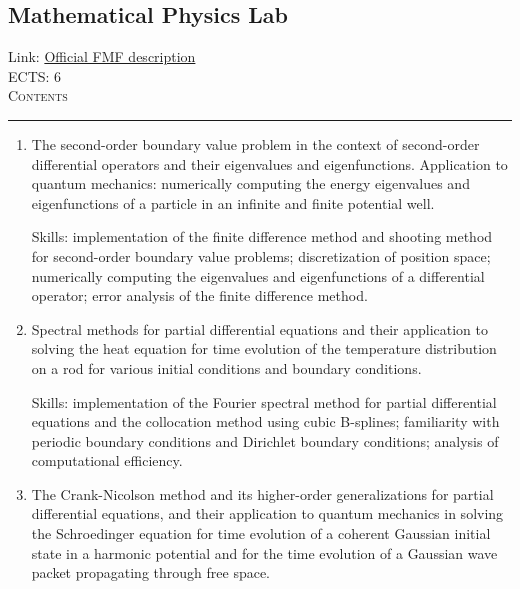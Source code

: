 \documentclass[11pt, a4paper]{article}
\newenvironment{course}[3]{
\subsection{#1}%
Link: \href{#2}{Official FMF description}\\%
ECTS: #3%
\vspace{1ex}
\\
{\large \textsc{Contents}}\\[-0.9ex]%
\rule{\textwidth}{0.5pt}
\vspace{-3ex}
}
{}
\newenvironment{chapter}[1]{
\begin{tcolorbox}[title=#1, breakable]
}
{\end{tcolorbox}}
\begin{document}
\begin{course}{Mathematical Physics Lab}{https://www.fmf.uni-lj.si/en/study-physics/programmes/1fiz/2020/7000777/courses/1159/}{6}
\begin{chapter}{Projects}
\begin{enumerate}
            Skills: numerical solutions of higher-order and vector-valued ordinary differential equations;
            implementation of symplectic integration methods (the 2nd-order Verlet method and the 4-th order position-extended Forest-Ruth method)
            implementation of standard numericla methods for ODEs (explicit Euler, Heun's method, the 2nd-order Runge-Kutta midpoint method, Ralston's 3rd-order RK3 method, 3rd-order strong, stability-preserving RK method, the classic and Ralston version of RK4, adaptive-step Runge-Kutta-Fehlberg and Cash-Karp methods, the 4th-order multistep predictor-corrector Adams-Bashforth-Moulton method)
            computation and plotting of phase spaces and vector fields
            numerical computation of elliptic integrals with arbitrary-precision libraries;
            analysis of solution accuracy and algorithmic efficiency.

            \item The second-order boundary value problem in the context of second-order differential operators and their eigenvalues and eigenfunctions.
            Application to quantum mechanics: numerically computing the energy eigenvalues and eigenfunctions of a particle in an infinite and finite potential well.

            Skills: implementation of the finite difference method and shooting method for second-order boundary value problems; discretization of position space; numerically computing the eigenvalues and eigenfunctions of a differential operator; error analysis of the finite difference method.

            \item Spectral methods for partial differential equations and their application to solving the heat equation for time evolution of the temperature distribution on a rod for various initial conditions and boundary conditions.

            Skills: implementation of the Fourier spectral method for partial differential equations and the collocation method using cubic B-splines;
            familiarity with periodic boundary conditions and Dirichlet boundary conditions;
            analysis of computational efficiency.

            \item The Crank-Nicolson method and its higher-order generalizations for partial differential equations, and their application to quantum mechanics in solving the Schroedinger equation for time evolution of a coherent Gaussian initial state in a harmonic potential and for the time evolution of a Gaussian wave packet propagating through free space.


\end{enumerate}
\end{chapter}
\end{course}
\end{document}
